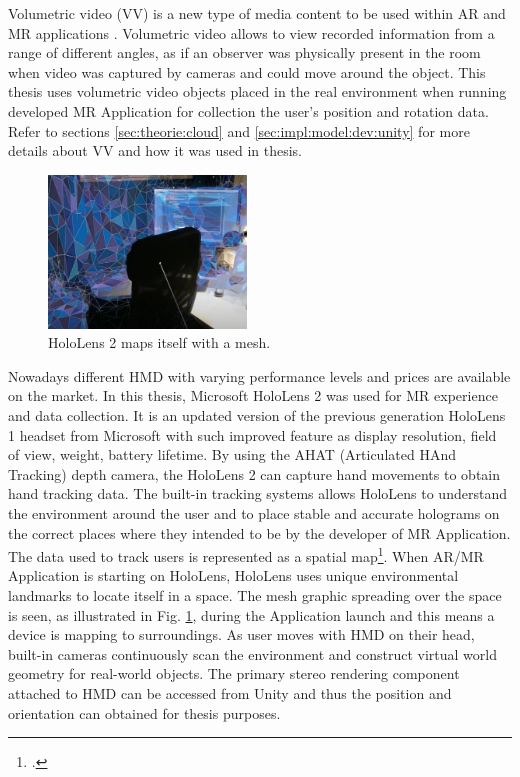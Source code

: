 Volumetric video (VV) is a new type of media content to be used within AR and MR applications \cite{user_behav_volumetric}. Volumetric video allows to view recorded information from a range of different angles, as if an observer was physically present in the room when video was captured by cameras and could move around the object. This thesis uses volumetric video objects placed in the real environment when running developed MR Application for collection the user's position and rotation data. Refer to sections \ref{sec:theorie:cloud} and \ref{sec:impl:model:dev:unity} for more details about VV and how it was used in thesis. 
\begin{figure}
	\centering
	\includegraphics[width=0.47\textwidth]{gfx/hololens_env.png}
	\caption{\label{fig:holo2_env}HoloLens 2 maps itself with a mesh.}
\end{figure}

Nowadays different HMD with varying performance levels and prices are available on the market. In this thesis, Microsoft HoloLens 2 was used for MR experience and data collection. It is an updated version of the previous generation HoloLens 1 headset from Microsoft with such improved feature as display resolution, field of view, weight, battery lifetime. By using the AHAT (Articulated HAnd Tracking) depth camera, the HoloLens 2 can capture hand movements to obtain hand tracking data. The built-in tracking systems allows HoloLens to understand the environment around the user and to place stable and accurate holograms on the correct places where they intended to be by the developer of MR Application. The data used to track users is represented as a spatial map\footcite{https://docs.microsoft.com/en-us/hololens/hololens-environment-considerations}. When AR/MR Application is starting on HoloLens, HoloLens uses unique environmental landmarks to locate itself in a space. The mesh graphic spreading over the space is seen, as illustrated in Fig. \ref{fig:holo2_env}, during the Application launch and this means a device is mapping to surroundings. As user moves with HMD on their head, built-in cameras continuously scan the environment and construct virtual world geometry for real-world objects. The primary stereo rendering component attached to HMD can be accessed from Unity and thus the position and orientation can obtained for thesis purposes. 

